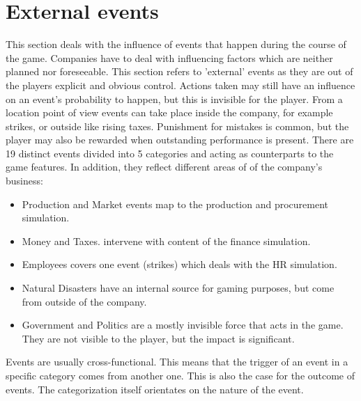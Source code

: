 \documentclass[11pt,titlepage,oneside,openany]{book}
\begin{document}
\section{External events}
This section deals with the influence of events that happen during the course of the game. Companies have to deal with influencing factors which are neither planned nor foreseeable\cite{Campbell}. This section refers to 'external' events as they are out of the players explicit and obvious control. Actions taken may still have an influence on an event's probability to happen, but this is invisible for the player. From a location point of view events can take place inside the company, for example strikes, or outside like rising taxes. Punishment for mistakes is common, but the player may also be rewarded when outstanding performance is present.  
There are 19 distinct events divided into 5 categories and acting as counterparts to the game features. In addition, they reflect different areas of of the company's business: 

\begin{itemize}
\item Production and Market events map to the production and procurement simulation. 
\item Money and Taxes. intervene with content of the finance simulation.  
\item Employees covers one event (strikes) which deals with the HR simulation.
\item Natural Disasters have an internal source for gaming purposes, but come from outside of the company. 
\item Government and Politics are a mostly invisible force that acts in the game. They are not visible to the player, but the impact is significant. 
\end{itemize}

Events are usually cross-functional. This means that the trigger of an event in a specific category comes from another one. This is also the case for the outcome of events. The categorization itself orientates on the nature of the event.
\end{document}
